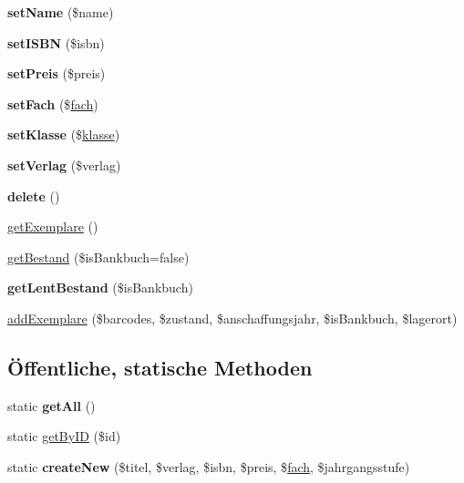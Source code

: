 \begin{DoxyCompactItemize}
\mbox{\label{class_schulbuch_a2adaf5697b78ce6ae3ce05fb425539bd}} 
{\bfseries set\+Name} (\$name)
\item 
\mbox{\label{class_schulbuch_a525c2381a66524dc5b34990dbf1c7bc1}} 
{\bfseries set\+I\+S\+BN} (\$isbn)
\item 
\mbox{\label{class_schulbuch_a64ab467bb3fc155542a9eed4c1beaa49}} 
{\bfseries set\+Preis} (\$preis)
\item 
\mbox{\label{class_schulbuch_a1dddb93875b014def5b6f51c9244486d}} 
{\bfseries set\+Fach} (\$\mbox{\hyperlink{classfach}{fach}})
\item 
\mbox{\label{class_schulbuch_a8d90d8e53c1b37620c823909b0490e0a}} 
{\bfseries set\+Klasse} (\$\mbox{\hyperlink{classklasse}{klasse}})
\item 
\mbox{\label{class_schulbuch_a7a4640159df657187a70956f97bdd764}} 
{\bfseries set\+Verlag} (\$verlag)
\item 
\mbox{\label{class_schulbuch_a4654aeb9ab4053cb6e5d2c7b0d5948be}} 
{\bfseries delete} ()
\item 
\mbox{\hyperlink{class_schulbuch_a215c174df71eb1ccec188dcfac698d23}{get\+Exemplare}} ()
\item 
\mbox{\hyperlink{class_schulbuch_a95a4cc2c16ada216be506ef40f598029}{get\+Bestand}} (\$is\+Bankbuch=false)
\item 
\mbox{\label{class_schulbuch_a308ab7474b23aa2e71c9a1fd89ec0a08}} 
{\bfseries get\+Lent\+Bestand} (\$is\+Bankbuch)
\item 
\mbox{\hyperlink{class_schulbuch_a49330d9548394938847b4e49bf89d7ed}{add\+Exemplare}} (\$barcodes, \$zustand, \$anschaffungsjahr, \$is\+Bankbuch, \$lagerort)
\end{DoxyCompactItemize}
\subsection*{Öffentliche, statische Methoden}
\begin{DoxyCompactItemize}
\item 
\mbox{\label{class_schulbuch_aabf4cd036b51ea6a9ec6af324dddf838}} 
static {\bfseries get\+All} ()
\item 
static \mbox{\hyperlink{class_schulbuch_ae19c7c8301c85aab2b4f518762e45364}{get\+By\+ID}} (\$id)
\item 
\mbox{\label{class_schulbuch_abc90626037623eda20d987b3796d11d0}} 
static {\bfseries create\+New} (\$titel, \$verlag, \$isbn, \$preis, \$\mbox{\hyperlink{classfach}{fach}}, \$jahrgangsstufe)
\end{DoxyCompactItemize}


